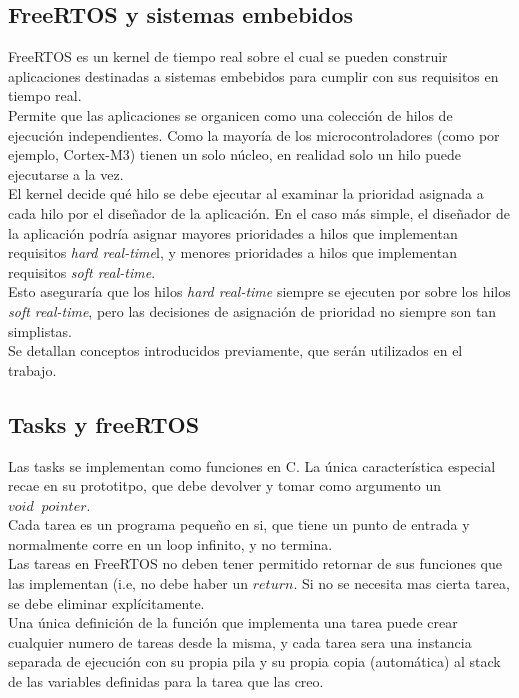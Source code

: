 \documentclass{article}
\begin{document}
\subsection{FreeRTOS y sistemas embebidos}
FreeRTOS es un kernel de tiempo real sobre el cual se pueden construir aplicaciones destinadas a sistemas embebidos para cumplir con sus requisitos en tiempo real.\\

Permite que las aplicaciones se organicen como una colección de hilos de ejecución independientes. Como la mayoría de los microcontroladores (como por ejemplo, Cortex-M3) tienen un solo núcleo, en realidad solo un hilo puede ejecutarse a la vez.\\

El kernel decide qué hilo se debe ejecutar al examinar la prioridad asignada a cada hilo por el diseñador de la aplicación. En el caso más simple, el diseñador de la aplicación podría asignar mayores prioridades a hilos que implementan requisitos \textit{hard real-time}l, y menores prioridades a hilos que implementan requisitos  \textit{soft real-time}. \\

Esto aseguraría que los hilos \textit{hard real-time} siempre se ejecuten por sobre los hilos \textit{soft real-time}, pero las decisiones de asignación de prioridad no siempre son tan simplistas.\\

Se detallan conceptos introducidos previamente, que serán utilizados en el trabajo.
\subsection{Tasks y freeRTOS}
Las tasks se implementan como funciones en C. La única característica especial recae en su prototitpo, que debe devolver y tomar como argumento un $void \; \; pointer$. \\

Cada tarea es un programa pequeño en si, que tiene un punto de entrada y normalmente corre en un loop infinito, y no termina. \\

Las tareas en FreeRTOS no deben tener permitido retornar de sus funciones que las implementan (i.e, no debe haber un $return$. Si no se necesita mas cierta tarea, se debe eliminar explícitamente.\\

Una única definición de la función que implementa una tarea puede crear cualquier numero de tareas desde la misma, y cada tarea sera una instancia separada de ejecución con su propia pila y su propia copia (automática) al stack de las
variables definidas para la tarea que las creo. \\
\end{document}
